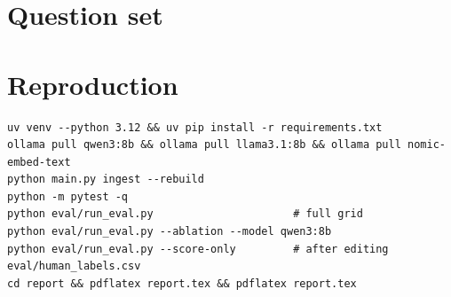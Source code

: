\documentclass[11pt,a4paper]{article}
\begin{document}
\appendix
\section{Question set}\label{app:questions}


\section{Reproduction}
\begin{verbatim}
uv venv --python 3.12 && uv pip install -r requirements.txt
ollama pull qwen3:8b && ollama pull llama3.1:8b && ollama pull nomic-embed-text
python main.py ingest --rebuild
python -m pytest -q
python eval/run_eval.py                      # full grid
python eval/run_eval.py --ablation --model qwen3:8b
python eval/run_eval.py --score-only         # after editing eval/human_labels.csv
cd report && pdflatex report.tex && pdflatex report.tex
\end{verbatim}
\end{document}
